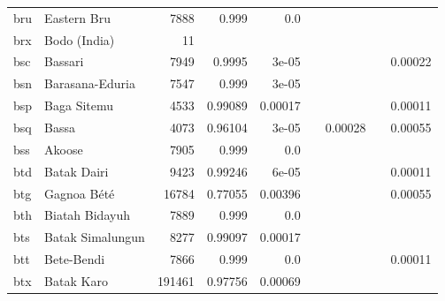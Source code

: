 \documentclass[11pt]{article}
\begin{document}
\begin{table*}[h]
{\begin{tabular}{llrrrrrrr}
bru         & Eastern Bru         & 7888         & 0.999         & 0.0         &          &          &          &          \\

brx         & Bodo (India)         & 11         &          &          &          &          &          &          \\

bsc         & Bassari         & 7949         & 0.9995         & 3e-05         &          &          &          & 0.00022         \\

bsn         & Barasana-Eduria         & 7547         & 0.999         & 3e-05         &          &          &          &          \\

bsp         & Baga Sitemu         & 4533         & 0.99089         & 0.00017         &          &          &          & 0.00011         \\

bsq         & Bassa         & 4073         & 0.96104         & 3e-05         &          & 0.00028         &          & 0.00055         \\

bss         & Akoose         & 7905         & 0.999         & 0.0         &          &          &          &          \\

btd         & Batak Dairi         & 9423         & 0.99246         & 6e-05         &          &          &          & 0.00011         \\

btg         & Gagnoa Bété         & 16784         & 0.77055         & 0.00396         &          &          &          & 0.00055         \\

bth         & Biatah Bidayuh         & 7889         & 0.999         & 0.0         &          &          &          &          \\

bts         & Batak Simalungun         & 8277         & 0.99097         & 0.00017         &          &          &          &          \\

btt         & Bete-Bendi         & 7866         & 0.999         & 0.0         &          &          &          & 0.00011         \\

btx         & Batak Karo         & 191461         & 0.97756         & 0.00069         &          &          &          &          \\


\end{tabular}}
\end{table*}
\end{document}
